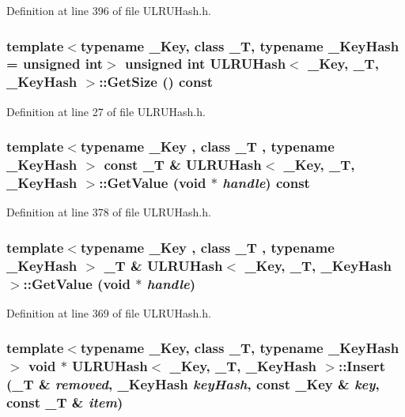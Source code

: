 Definition at line 396 of file ULRUHash.h.\hypertarget{class_u_l_r_u_hash_7d623f663f2644180432bd29c9fdd801}{
\subsubsection[{GetSize}]{\setlength{\rightskip}{0pt plus 5cm}template$<$typename \_\-Key, class \_\-T, typename \_\-KeyHash = unsigned int$>$ unsigned int {\bf ULRUHash}$<$ \_\-Key, \_\-T, \_\-KeyHash $>$::GetSize () const}}
\label{class_u_l_r_u_hash_7d623f663f2644180432bd29c9fdd801}




Definition at line 27 of file ULRUHash.h.\hypertarget{class_u_l_r_u_hash_84fe767898f076199811f7ad2bfe68f6}{
\subsubsection[{GetValue}]{\setlength{\rightskip}{0pt plus 5cm}template$<$typename \_\-Key , class \_\-T , typename \_\-KeyHash $>$ const \_\-T \& {\bf ULRUHash}$<$ \_\-Key, \_\-T, \_\-KeyHash $>$::GetValue (void $\ast$ {\em handle}) const}}
\label{class_u_l_r_u_hash_84fe767898f076199811f7ad2bfe68f6}




Definition at line 378 of file ULRUHash.h.\hypertarget{class_u_l_r_u_hash_956f682dbfdc15c021d6653e045b51fb}{
\subsubsection[{GetValue}]{\setlength{\rightskip}{0pt plus 5cm}template$<$typename \_\-Key , class \_\-T , typename \_\-KeyHash $>$ \_\-T \& {\bf ULRUHash}$<$ \_\-Key, \_\-T, \_\-KeyHash $>$::GetValue (void $\ast$ {\em handle})}}
\label{class_u_l_r_u_hash_956f682dbfdc15c021d6653e045b51fb}




Definition at line 369 of file ULRUHash.h.\hypertarget{class_u_l_r_u_hash_1f01c54091d166f1f32e4981f00a311b}{
\subsubsection[{Insert}]{\setlength{\rightskip}{0pt plus 5cm}template$<$typename \_\-Key, class \_\-T, typename \_\-KeyHash$>$ void $\ast$ {\bf ULRUHash}$<$ \_\-Key, \_\-T, \_\-KeyHash $>$::Insert (\_\-T \& {\em removed}, \/  \_\-KeyHash {\em keyHash}, \/  const \_\-Key \& {\em key}, \/  const \_\-T \& {\em item})}}
\label{class_u_l_r_u_hash_1f01c54091d166f1f32e4981f00a311b}





